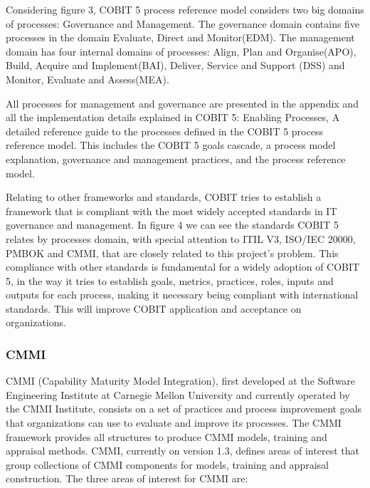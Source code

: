 Considering figure 3, COBIT 5 process reference model considers two big domains of processes: Governance and Management. The governance domain contains five processes in the domain Evaluate, Direct and Monitor(EDM). The management domain has four internal domains of processes: Align, Plan and Organise(APO), Build, Acquire and Implement(BAI), Deliver, Service and Support (DSS) and Monitor, Evaluate and Assess(MEA).\par
All processes for management and governance are presented in the appendix and all the implementation details explained in COBIT 5: Enabling Processes, A detailed reference guide to the processes defined in the COBIT 5 process reference model. This includes the COBIT 5 goals cascade, a process model explanation, governance and management practices, and the process reference model\cite{2012cobitEP}.\par
Relating to other frameworks and standards, COBIT tries to establish a framework that is compliant with the most widely accepted standards in IT governance and management. In figure 4 we can see the standards COBIT 5 relates by processes domain, with special attention to ITIL V3\cite{itilSS,itilSD,itilSO,itilST,itilCSI}, ISO/IEC 20000\cite{ISO20000-1}, PMBOK\cite{pmbok5} and CMMI\cite{cmmi}, that are closely related to this project's problem. This compliance with other standards is fundamental for a widely adoption of COBIT 5, in the way it tries to establish goals, metrics, practices, roles, inputs and outputs for each process, making it necessary being compliant with international standards. This will improve COBIT application and acceptance on organizations.\par


\subsubsection{CMMI}

CMMI (Capability Maturity Model Integration), first developed at the Software Engineering Institute at Carnegie Mellon University and currently operated by the CMMI Institute, consists on a set of practices and process improvement goals that organizations can use to evaluate and improve its processes. The CMMI framework provides all structures to produce CMMI models, training and appraisal methods.
CMMI, currently on version 1.3, defines areas of interest that group collections of CMMI components for models, training and appraisal construction. The three areas of interest for CMMI are:

